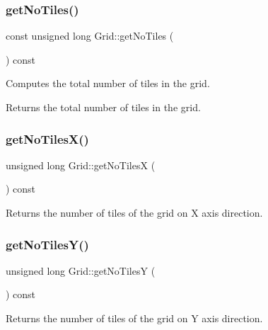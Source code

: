 \subsubsection{\texorpdfstring{get\+No\+Tiles()}{getNoTiles()}}
{\footnotesize\ttfamily const unsigned long Grid\+::get\+No\+Tiles (\begin{DoxyParamCaption}{ }\end{DoxyParamCaption}) const}

Computes the total number of tiles in the grid. \begin{DoxyReturn}{Returns}
the total number of tiles in the grid. 
\end{DoxyReturn}
\mbox{\label{class_grid_af29c0c404a908aa46f83afb17d7609a6}} 
\subsubsection{\texorpdfstring{get\+No\+Tiles\+X()}{getNoTilesX()}}
{\footnotesize\ttfamily unsigned long Grid\+::get\+No\+TilesX (\begin{DoxyParamCaption}{ }\end{DoxyParamCaption}) const}

\begin{DoxyReturn}{Returns}
the number of tiles of the grid on X axis direction. 
\end{DoxyReturn}
\mbox{\label{class_grid_a783a3153d03154cfd33e6a418bb8d390}} 
\subsubsection{\texorpdfstring{get\+No\+Tiles\+Y()}{getNoTilesY()}}
{\footnotesize\ttfamily unsigned long Grid\+::get\+No\+TilesY (\begin{DoxyParamCaption}{ }\end{DoxyParamCaption}) const}

\begin{DoxyReturn}{Returns}
the number of tiles of the grid on Y axis direction. 
\end{DoxyReturn}
\mbox{\label{class_grid_aa8d3de015a2b22d0cd0d72b3e7c29088}} 
